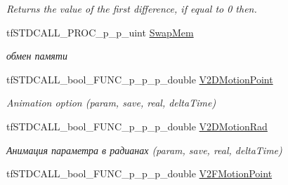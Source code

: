 \begin{DoxyCompactItemize}
\begin{DoxyCompactList}\small\item\em Returns the value of the first difference, if equal to 0 then. \end{DoxyCompactList}\item 
\hypertarget{structs_functions_extension_c_p_u_ac861cf15e9f90b48a4a6695ad21a1b3e}{tf\-S\-T\-D\-C\-A\-L\-L\-\_\-\-P\-R\-O\-C\-\_\-p\-\_\-p\-\_\-uint \hyperlink{structs_functions_extension_c_p_u_ac861cf15e9f90b48a4a6695ad21a1b3e}{Swap\-Mem}}\label{structs_functions_extension_c_p_u_ac861cf15e9f90b48a4a6695ad21a1b3e}

\begin{DoxyCompactList}\small\item\em обмен памяти \end{DoxyCompactList}\item 
\hypertarget{structs_functions_extension_c_p_u_a45f95163193d0984011db62259369cb2}{tf\-S\-T\-D\-C\-A\-L\-L\-\_\-bool\-\_\-\-F\-U\-N\-C\-\_\-p\-\_\-p\-\_\-p\-\_\-double \hyperlink{structs_functions_extension_c_p_u_a45f95163193d0984011db62259369cb2}{V2\-D\-Motion\-Point}}\label{structs_functions_extension_c_p_u_a45f95163193d0984011db62259369cb2}

\begin{DoxyCompactList}\small\item\em Animation option (param, save, real, delta\-Time) \end{DoxyCompactList}\item 
\hypertarget{structs_functions_extension_c_p_u_ab246ba3f4fc13d5791f7efbd62e34e75}{tf\-S\-T\-D\-C\-A\-L\-L\-\_\-bool\-\_\-\-F\-U\-N\-C\-\_\-p\-\_\-p\-\_\-p\-\_\-double \hyperlink{structs_functions_extension_c_p_u_ab246ba3f4fc13d5791f7efbd62e34e75}{V2\-D\-Motion\-Rad}}\label{structs_functions_extension_c_p_u_ab246ba3f4fc13d5791f7efbd62e34e75}

\begin{DoxyCompactList}\small\item\em Анимация параметра в радианах (param, save, real, delta\-Time) \end{DoxyCompactList}\item 
\hypertarget{structs_functions_extension_c_p_u_aaddf731dadbe246ad55c3359a3d973a5}{tf\-S\-T\-D\-C\-A\-L\-L\-\_\-bool\-\_\-\-F\-U\-N\-C\-\_\-p\-\_\-p\-\_\-p\-\_\-double \hyperlink{structs_functions_extension_c_p_u_aaddf731dadbe246ad55c3359a3d973a5}{V2\-F\-Motion\-Point}}\label{structs_functions_extension_c_p_u_aaddf731dadbe246ad55c3359a3d973a5}


\end{DoxyCompactItemize}
